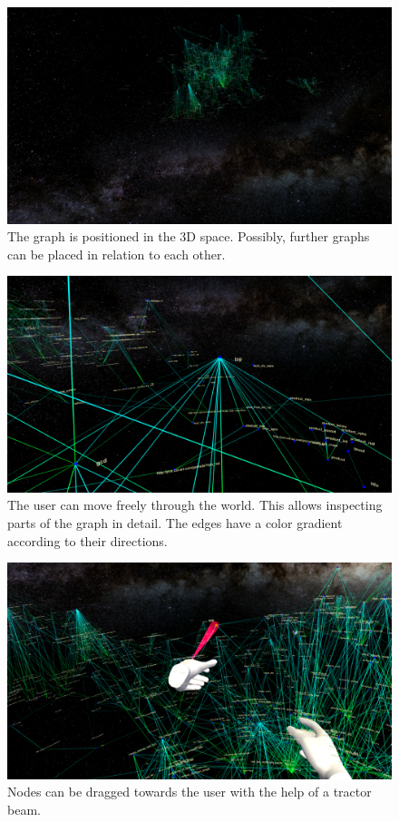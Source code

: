 \documentclass{llncs}
\begin{document}
\begin{figure}
    \centering
    \includegraphics[width=1\textwidth ]{galaxyfaraway}
    \caption{The graph is positioned in the 3D space. Possibly, further graphs can be placed in relation to each other.}
    \label{fig:sample_figure}
\end{figure}

\begin{figure}
    \centering
    \includegraphics[width=1\textwidth ]{part}
    \caption{The user can move freely through the world. This allows inspecting parts of the graph in detail. The edges have a color gradient according to their directions.}
    \label{fig:sample_figure}
\end{figure}


\begin{figure}
    \centering
    \includegraphics[width=1\textwidth ]{tractor}
    \caption{Nodes can be dragged towards the user with the help of a tractor beam.}
    \label{fig:sample_figure}
\end{figure}
\end{document}
